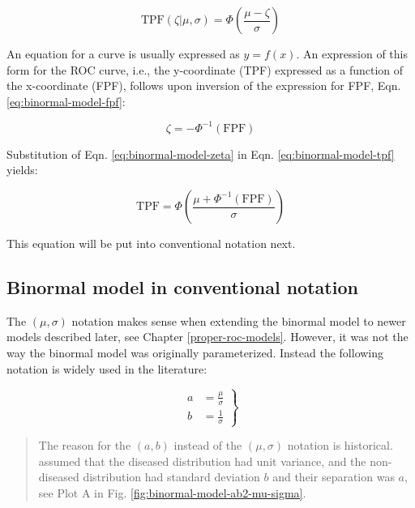 \documentclass[
]{book}
\begin{document}
\begin{equation} 
\text{TPF}\left ( \zeta | \mu, \sigma \right ) = \Phi\left ( \frac{\mu-\zeta}{\sigma} \right )
\label{eq:binormal-model-tpf}
\end{equation}

An equation for a curve is usually expressed as \(y=f(x)\). An expression of this form for the ROC curve, i.e., the y-coordinate (TPF) expressed as a function of the x-coordinate (FPF), follows upon inversion of the expression for FPF, Eqn. \eqref{eq:binormal-model-fpf}:

\begin{equation} 
\zeta = -\Phi^{-1}\left ( \text{FPF} \right )
\label{eq:binormal-model-zeta}
\end{equation}

Substitution of Eqn. \eqref{eq:binormal-model-zeta} in Eqn. \eqref{eq:binormal-model-tpf} yields:

\begin{equation} 
\text{TPF} = \Phi\left ( \frac{\mu + \Phi^{-1}\left (\text{FPF}  \right )}{\sigma} \right )
\label{eq:binormal-model-roc-curve1}
\end{equation}

This equation will be put into conventional notation next.

\hypertarget{binormal-model-in-conventional-notation}{%
\subsection{Binormal model in conventional notation}\label{binormal-model-in-conventional-notation}}

The \((\mu,\sigma)\) notation makes sense when extending the binormal model to newer models described later, see Chapter \ref{proper-roc-models}. However, it was not the way the binormal model was originally parameterized. Instead the following notation is widely used in the literature:

\begin{equation} 
\left. 
\begin{aligned}
a&=\frac{\mu}{\sigma}\\
b&=\frac{1}{\sigma}
\end{aligned}
\right \}
\label{eq:binormal-model-ab-parameters}
\end{equation}

\begin{quote}
The reason for the \((a,b)\) instead of the \((\mu,\sigma)\) notation is historical. \citep{dorfman1969maximum} assumed that the diseased distribution had unit variance, and the non-diseased distribution had standard deviation \(b\) and their separation was \(a\), see Plot A in Fig. \ref{fig:binormal-model-ab2-mu-sigma}.
\end{quote}
\end{document}
